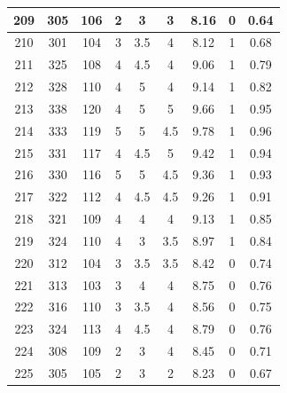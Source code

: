 \documentclass[11pt]{article}
\begin{document}
\begin{appendix}
\begin{longtable}[H]{|c|c|c|c|c|c|c|c|c|}
	209        & 305       & 106         & 2                 & 3   & 3   & 8.16 & 0        & 0.64            \\ \hline
	210        & 301       & 104         & 3                 & 3.5 & 4   & 8.12 & 1        & 0.68            \\ \hline
	211        & 325       & 108         & 4                 & 4.5 & 4   & 9.06 & 1        & 0.79            \\ \hline
	212        & 328       & 110         & 4                 & 5   & 4   & 9.14 & 1        & 0.82            \\ \hline
	213        & 338       & 120         & 4                 & 5   & 5   & 9.66 & 1        & 0.95            \\ \hline
	214        & 333       & 119         & 5                 & 5   & 4.5 & 9.78 & 1        & 0.96            \\ \hline
	215        & 331       & 117         & 4                 & 4.5 & 5   & 9.42 & 1        & 0.94            \\ \hline
	216        & 330       & 116         & 5                 & 5   & 4.5 & 9.36 & 1        & 0.93            \\ \hline
	217        & 322       & 112         & 4                 & 4.5 & 4.5 & 9.26 & 1        & 0.91            \\ \hline
	218        & 321       & 109         & 4                 & 4   & 4   & 9.13 & 1        & 0.85            \\ \hline
	219        & 324       & 110         & 4                 & 3   & 3.5 & 8.97 & 1        & 0.84            \\ \hline
	220        & 312       & 104         & 3                 & 3.5 & 3.5 & 8.42 & 0        & 0.74            \\ \hline
	221        & 313       & 103         & 3                 & 4   & 4   & 8.75 & 0        & 0.76            \\ \hline
	222        & 316       & 110         & 3                 & 3.5 & 4   & 8.56 & 0        & 0.75            \\ \hline
	223        & 324       & 113         & 4                 & 4.5 & 4   & 8.79 & 0        & 0.76            \\ \hline
	224        & 308       & 109         & 2                 & 3   & 4   & 8.45 & 0        & 0.71            \\ \hline
	225        & 305       & 105         & 2                 & 3   & 2   & 8.23 & 0        & 0.67            \\ \hline

\end{longtable}
\end{appendix}
\end{document}
